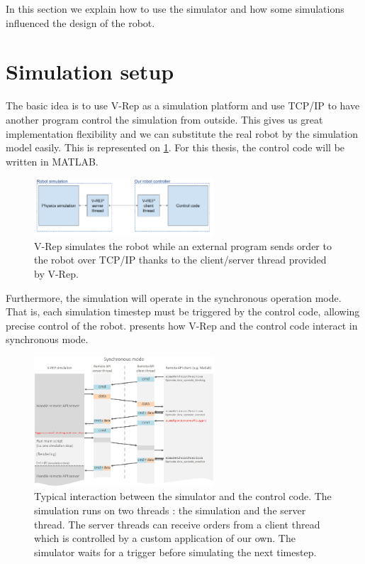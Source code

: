 In this section we explain how to use the simulator and how some simulations influenced the design of the robot.

\section{Simulation setup}
The basic idea is to use V-Rep as a simulation platform and use TCP/IP to have another program control the simulation from outside. This gives us great implementation flexibility and we can substitute the real robot by the simulation model easily. This is represented on \cref{fig:simulation_principles}. For this thesis, the control code will be written in MATLAB. 

\begin{figure}[htp]
\center
\includegraphics[width=0.6\textwidth]{figures/simulation_principles}
\caption[Simulation principles]{V-Rep simulates the robot while an external program sends order to the robot over TCP/IP thanks to the client/server thread provided by V-Rep.}
\label{fig:simulation_principles}
\end{figure}

Furthermore, the simulation will operate in the synchronous operation mode. That is, each simulation timestep must be triggered by the control code, allowing precise control of the robot.  presents how V-Rep and the control code interact in synchronous mode.

\begin{figure}[htp]
\center
\includegraphics[width=0.6\textwidth]{figures/remoteApiSynchronous}
\caption[Simulation interaction]{Typical interaction between the simulator and the control code. The simulation runs on two threads : the simulation and the server thread. The server threads can receive orders from a client thread which is controlled by a custom application of our own. The simulator waits for a trigger before simulating the next timestep.}
\label{fig:remoteApi}
\end{figure}


